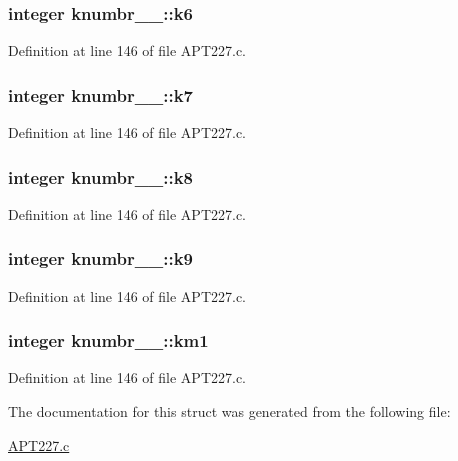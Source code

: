 \subsubsection[{\texorpdfstring{k6}{k6}}]{\setlength{\rightskip}{0pt plus 5cm}integer knumbr\+\_\+\_\+\+::k6}\hypertarget{structknumbr__1___ab0dff3dff5cc95d062d9111a352a7ddd}{}\label{structknumbr__1___ab0dff3dff5cc95d062d9111a352a7ddd}


Definition at line 146 of file A\+P\+T227.\+c.

\subsubsection[{\texorpdfstring{k7}{k7}}]{\setlength{\rightskip}{0pt plus 5cm}integer knumbr\+\_\+\_\+\+::k7}\hypertarget{structknumbr__1___a4bcf4e5cc1c8baf9eee2c1688c07ea19}{}\label{structknumbr__1___a4bcf4e5cc1c8baf9eee2c1688c07ea19}


Definition at line 146 of file A\+P\+T227.\+c.

\subsubsection[{\texorpdfstring{k8}{k8}}]{\setlength{\rightskip}{0pt plus 5cm}integer knumbr\+\_\+\_\+\+::k8}\hypertarget{structknumbr__1___a95fd6fe777df43b231354d5ee9d0c40f}{}\label{structknumbr__1___a95fd6fe777df43b231354d5ee9d0c40f}


Definition at line 146 of file A\+P\+T227.\+c.

\subsubsection[{\texorpdfstring{k9}{k9}}]{\setlength{\rightskip}{0pt plus 5cm}integer knumbr\+\_\+\_\+\+::k9}\hypertarget{structknumbr__1___a1bd7365c8aa11544505cac688b7ab2af}{}\label{structknumbr__1___a1bd7365c8aa11544505cac688b7ab2af}


Definition at line 146 of file A\+P\+T227.\+c.

\subsubsection[{\texorpdfstring{km1}{km1}}]{\setlength{\rightskip}{0pt plus 5cm}integer knumbr\+\_\+\_\+\+::km1}\hypertarget{structknumbr__1___aece7093f905ba0bd8f3046c8ec704426}{}\label{structknumbr__1___aece7093f905ba0bd8f3046c8ec704426}


Definition at line 146 of file A\+P\+T227.\+c.



The documentation for this struct was generated from the following file\+:\begin{DoxyCompactItemize}
\item 
\hyperlink{APT227_8c}{A\+P\+T227.\+c}\end{DoxyCompactItemize}
